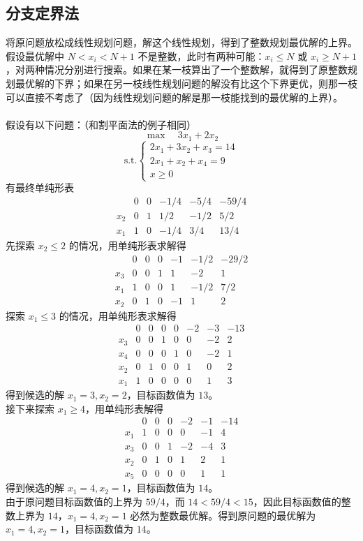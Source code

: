 \subsection{分支定界法}
将原问题放松成线性规划问题，解这个线性规划，得到了整数规划最优解的上界。假设最优解中 $N < x_i < N + 1$ 不是整数，此时有两种可能：$x_i \le N$ 或 $x_i \ge N+1$，对两种情况分别进行搜索。如果在某一枝算出了一个整数解，就得到了原整数规划最优解的下界；如果在另一枝线性规划问题的解没有比这个下界更优，则那一枝可以直接不考虑了（因为线性规划问题的解是那一枝能找到的最优解的上界）。 \\~\\
假设有以下问题：（和割平面法的例子相同）
$$
\max \quad 3x_1 + 2x_2
$$
$$
\text{s.t.} 
\begin{cases}
    2x_1 + 3x_2 + x_3 = 14 \\
    2x_1 + x_2 + x_4 = 9 \\
    x \ge 0
\end{cases}
$$
有最终单纯形表
$$
\begin{array}{c|cccc|c} & 0 & 0 & -1/4 & -5/4 & -59/4 \\ \hline x_2 & 0 & 1 & 1/2 & -1/2 & 5/2 \\ x_1 & 1 & 0 & -1/4 & 3/4 & 13/4 \end{array}
$$
先探索 $x_2 \le 2$ 的情况，用单纯形表求解得
$$
\begin{array}{c|ccccc|c} & 0 & 0 & 0 & -1 & -1/2 & -29/2 \\ \hline x_3 & 0 & 0 & 1 & 1 & -2 & 1 \\ x_1 & 1 & 0 & 0 & 1 & -1/2 & 7/2 \\ x_2 & 0 & 1 & 0 & -1 & 1 & 2 \end{array}
$$
探索 $x_1 \le 3$ 的情况，用单纯形表求解得
$$
\begin{array}{c|cccccc|c} & 0 & 0 & 0 & 0 & -2 & -3 & -13 \\ \hline x_3 & 0 & 0 & 1 & 0 & 0 & -2 & 2 \\ x_4 & 0 & 0 & 0 & 1 & 0 & -2 & 1 \\ x_2 & 0 & 1 & 0 & 0 & 1 & 0 & 2 \\ x_1 & 1 & 0 & 0 & 0 & 0 & 1 & 3 \end{array}
$$
得到候选的解 $x_1 = 3, x_2 = 2$，目标函数值为 $13$。 \\
接下来探索 $x_1 \ge 4$，用单纯形表解得
$$
\begin{array}{c|ccccc|c} & 0 & 0 & 0 & -2 & -1 & -14 \\ \hline x_1 & 1 & 0 & 0 & 0 & -1 & 4 \\ x_3 & 0 & 0 & 1 & -2 & -4 & 3 \\ x_2 & 0 & 1 & 0 & 1 & 2 & 1 \\ x_5 & 0 & 0 & 0 & 0 & 1 & 1 \end{array}
$$
得到候选的解 $x_1 = 4, x_2 = 1$，目标函数值为 $14$。 \\
由于原问题目标函数值的上界为 $59/4$，而 $14 < 59/4 < 15$，因此目标函数值的整数上界为 $14$，$x_1 = 4, x_2 = 1$ 必然为整数最优解。得到原问题的最优解为 $x_1 = 4, x_2 = 1$，目标函数值为 $14$。

\pagebreak
